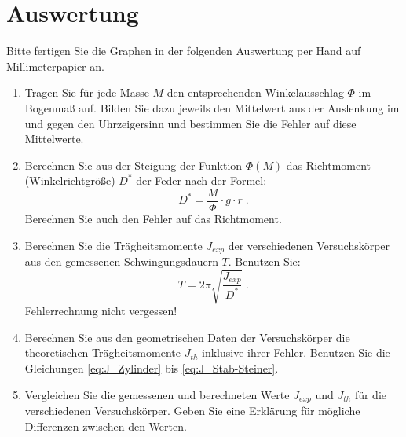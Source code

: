 \section{Auswertung} 

\begin{hint}
	Bitte fertigen Sie die Graphen in der folgenden Auswertung per Hand auf Millimeterpapier an.
\end{hint}

\begin{enumerate}
	\item Tragen Sie für jede Masse $M$ den entsprechenden Winkelausschlag $\Phi$ im Bogenmaß auf. Bilden Sie dazu jeweils den Mittelwert aus der Auslenkung im und gegen den Uhrzeigersinn und bestimmen Sie die Fehler auf diese Mittelwerte.
 \item Berechnen Sie aus der Steigung der Funktion $\Phi (M)$ das Richtmoment (Winkelrichtgröße) $D^*$ der Feder nach der Formel:
 \begin{equation}
 D^* = \frac{M}{\Phi}\cdot g\cdot r \; .
 \end{equation}
 Berechnen Sie auch den Fehler auf das Richtmoment.
 \item Berechnen Sie die Trägheitsmomente $J_{exp}$ der verschiedenen Versuchskörper aus den gemessenen Schwingungsdauern $T$. Benutzen Sie:
 \begin{equation}
 T = 2\pi\sqrt{\frac{J_{exp}}{D^*}} \; .
 \end{equation}
 Fehlerrechnung nicht vergessen!
 \item Berechnen Sie aus den geometrischen Daten der Versuchskörper die theoretischen Trägheitsmomente $J_{th}$ inklusive ihrer Fehler. Benutzen Sie die Gleichungen \ref{eq:J_Zylinder} bis \ref{eq:J_Stab-Steiner}.
 \item Vergleichen Sie die gemessenen und berechneten Werte $J_{exp}$ und $J_{th}$ für die verschiedenen Versuchskörper. Geben Sie eine Erklärung für mögliche Differenzen zwischen den Werten.
\end{enumerate}
